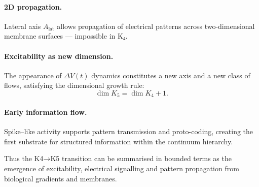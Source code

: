 \paragraph{2D propagation.}
Lateral axis $A_{\mathrm{lat}}$ allows propagation of electrical patterns
across two-dimensional membrane surfaces — impossible in K₄.

\paragraph{Excitability as new dimension.}
The appearance of $\Delta V(t)$ dynamics constitutes a new axis and a new
class of flows, satisfying the dimensional growth rule:
\[
\dim K_5 = \dim K_4 + 1.
\]

\paragraph{Early information flow.}
Spike–like activity supports pattern transmission and proto-coding,
creating the first substrate for structured information within the
continuum hierarchy.

Thus the K4→K5 transition can be summarised in bounded terms as the
emergence of excitability, electrical signalling and pattern propagation
from biological gradients and membranes.

